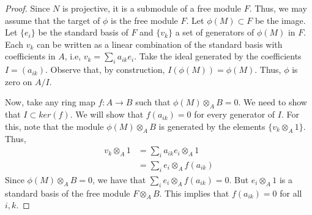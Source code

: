 \documentclass[11pt]{amsart}
\theoremstyle{definition}
\begin{document}
\begin{proof}
	Since $N$ is projective, it is a submodule of a free module $F$. Thus, we may assume that the target of $\phi$ is the free module $F$. Let $\phi(M)\subset F$ be the image. Let $\{e_i\}$ be the standard basis of $F$ and $\{v_k\}$ a set of generators of $\phi(M)$ in $F$. Each $v_k$ can be written as a linear combination of the standard basis with coefficients in $A$, i.e, $v_k=\sum_i a_{ik}e_i$. Take the ideal generated by the coefficients $I=(a_{ik})$. Observe that, by construction, $I(\phi(M))=\phi(M)$. Thus, $\phi$ is zero on $A/I$.
	
	Now, take any ring map $f:A\rightarrow B$ such that $\phi(M) \otimes_A B=0$. We need to show that $I\subset ker(f)$. We will show that $f(a_{ik})=0$ for every generator of $I$. For this, note that the module $\phi(M) \otimes_A B$ is generated by the elements $\{v_k\otimes_A 1\}$. Thus,
	\begin{align*}
	v_k\otimes_A 1 & = \sum_i a_{ik}e_i \otimes_A 1\\
	&= \sum_i e_i \otimes_A f(a_{ik})
	\end{align*}
	Since $\phi(M) \otimes_A B=0$, we have that $\sum_i e_i \otimes_A f(a_{ik})=0$. But $e_i\otimes_A 1$ is a standard basis of the free module $F\otimes_A B$. This implies that $f(a_{ik})=0$ for all $i,k$.
\end{proof}


\newpage


\end{document}
